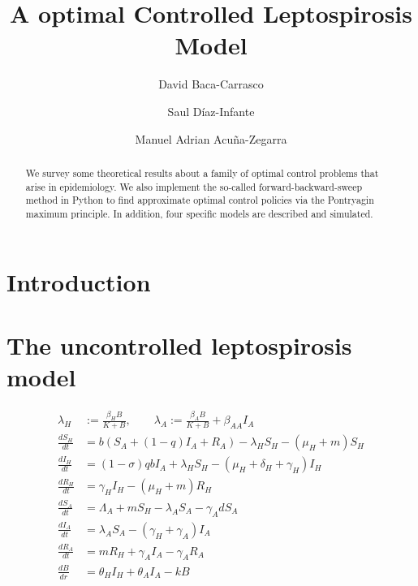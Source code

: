 \documentclass[11pt]{amsart}
\title[%
	A optimal Controlled Leptospirosis Model%
	]{
	A optimal Controlled Leptospirosis Model
}
\author[D. Baca]{David Baca-Carrasco}
\author[S. D\'iaz-Infante]{Saul D\'iaz-Infante}
\author[M.A. Acu\~{n}a]{Manuel Adrian Acu\~{n}a-Zegarra}
\theoremstyle{definition}
\numberwithin{equation}{section}
\begin{document}
  \begin{abstract}
    We survey some theoretical results about a family of optimal 
    control problems that arise in epidemiology. We also implement the
    so-called forward-backward-sweep method in Python to find approximate
    optimal control policies via the Pontryagin maximum principle. 
    In addition, four specific models are described and simulated.
  \end{abstract}
\maketitle
%
  \section{Introduction}
 
\section{The uncontrolled leptospirosis model}
      \begin{equation}
        \begin{aligned}
                \lambda_H &:= \frac{\beta_H B}{K + B}, \qquad
                \lambda_A := \frac{\beta_A B}{K + B} + \beta_{AA} I_A
                \\
                \frac{d S_H}{dt} &=
                    b (S_A + (1 - q) I_A + R_A)
                    - \lambda_H S_H - (\mu_H + m) S_H 
                \\
                \frac{d I_H}{dt} &=
                    (1 - \sigma)   q   b   I_A
                    + \lambda_H S_H - (\mu_H + \delta_H + \gamma_H)I_H
                \\
                \frac{d R_H}{dt} &=
                    \gamma_H I_H - (\mu_H + m) R_H
                \\
                \frac{dS_A}{dt} &=
                    \Lambda_A + m S_H - \lambda_A S_A - \gamma_A dS_A
                \\
                \frac{d I_A}{dt} &=
                    \lambda_A S_A - (\gamma_H + \gamma_A)   I_A
                \\
                \frac{dR_A}{dt} &=
                    m R_H + \gamma_A I_A - \gamma_A R_A
                \\
                \frac{dB}{dr} &=
                    \theta_H I_H + \theta_A I_A - k B
           \end{aligned}
      \end{equation}
\end{document}
